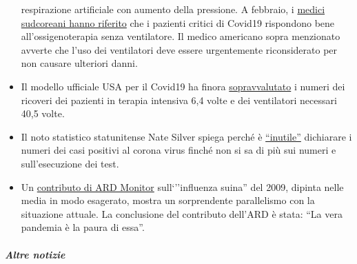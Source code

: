 \begin{itemize}
  respirazione artificiale con aumento della pressione. A febbraio, i
  \href{https://www.upi.com/Top_News/World-News/2020/02/14/Oxygen-therapy-working-for-coronavirus-patient-Seoul-says/6651581696794/}{medici
  sudcoreani hanno riferito} che i pazienti critici di Covid19
  rispondono bene all'ossigenoterapia senza ventilatore. Il medico
  americano sopra menzionato avverte che l'uso dei ventilatori deve
  essere urgentemente riconsiderato per non causare ulteriori danni.
\item
  Il modello ufficiale USA per il Covid19 ha finora
  \href{https://twitter.com/NikolovScience/status/1246823479820693505}{sopravvalutato}
  i numeri dei ricoveri dei pazienti in terapia intensiva 6,4 volte e
  dei ventilatori necessari 40,5 volte.
\item
  Il noto statistico statunitense Nate Silver spiega perché è
  \href{https://fivethirtyeight.com/features/coronavirus-case-counts-are-meaningless/}{``inutile''}
  dichiarare i numeri dei casi positivi al corona virus finché non si sa
  di più sui numeri e sull'esecuzione dei test. 
\item
  Un \href{https://vimeo.com/403175258}{contributo di ARD Monitor}
  sull`''influenza suina'' del 2009, dipinta nelle media in modo
  esagerato, mostra un sorprendente parallelismo con la situazione
  attuale. La conclusione del contributo dell'ARD è stata: ``La vera
  pandemia è la paura di essa''.
\end{itemize}

\hypertarget{altre-notizie}{%
\subparagraph{\texorpdfstring{\textbf{Altre
notizie}}{Altre notizie}}\label{altre-notizie}}

